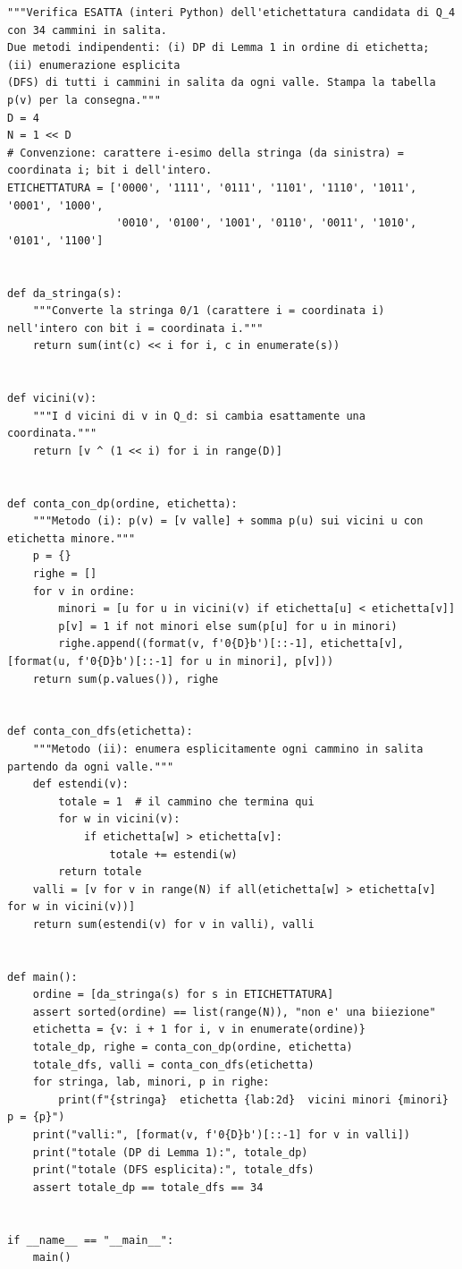 \documentclass[11pt,a4paper]{article}
\begin{document}
\begin{lstlisting}[caption={certificati/verifica\_etichettatura\_q4.py}]
"""Verifica ESATTA (interi Python) dell'etichettatura candidata di Q_4 con 34 cammini in salita.
Due metodi indipendenti: (i) DP di Lemma 1 in ordine di etichetta; (ii) enumerazione esplicita
(DFS) di tutti i cammini in salita da ogni valle. Stampa la tabella p(v) per la consegna."""
D = 4
N = 1 << D
# Convenzione: carattere i-esimo della stringa (da sinistra) = coordinata i; bit i dell'intero.
ETICHETTATURA = ['0000', '1111', '0111', '1101', '1110', '1011', '0001', '1000',
                 '0010', '0100', '1001', '0110', '0011', '1010', '0101', '1100']


def da_stringa(s):
    """Converte la stringa 0/1 (carattere i = coordinata i) nell'intero con bit i = coordinata i."""
    return sum(int(c) << i for i, c in enumerate(s))


def vicini(v):
    """I d vicini di v in Q_d: si cambia esattamente una coordinata."""
    return [v ^ (1 << i) for i in range(D)]


def conta_con_dp(ordine, etichetta):
    """Metodo (i): p(v) = [v valle] + somma p(u) sui vicini u con etichetta minore."""
    p = {}
    righe = []
    for v in ordine:
        minori = [u for u in vicini(v) if etichetta[u] < etichetta[v]]
        p[v] = 1 if not minori else sum(p[u] for u in minori)
        righe.append((format(v, f'0{D}b')[::-1], etichetta[v], [format(u, f'0{D}b')[::-1] for u in minori], p[v]))
    return sum(p.values()), righe


def conta_con_dfs(etichetta):
    """Metodo (ii): enumera esplicitamente ogni cammino in salita partendo da ogni valle."""
    def estendi(v):
        totale = 1  # il cammino che termina qui
        for w in vicini(v):
            if etichetta[w] > etichetta[v]:
                totale += estendi(w)
        return totale
    valli = [v for v in range(N) if all(etichetta[w] > etichetta[v] for w in vicini(v))]
    return sum(estendi(v) for v in valli), valli


def main():
    ordine = [da_stringa(s) for s in ETICHETTATURA]
    assert sorted(ordine) == list(range(N)), "non e' una biiezione"
    etichetta = {v: i + 1 for i, v in enumerate(ordine)}
    totale_dp, righe = conta_con_dp(ordine, etichetta)
    totale_dfs, valli = conta_con_dfs(etichetta)
    for stringa, lab, minori, p in righe:
        print(f"{stringa}  etichetta {lab:2d}  vicini minori {minori}  p = {p}")
    print("valli:", [format(v, f'0{D}b')[::-1] for v in valli])
    print("totale (DP di Lemma 1):", totale_dp)
    print("totale (DFS esplicita):", totale_dfs)
    assert totale_dp == totale_dfs == 34


if __name__ == "__main__":
    main()

\end{lstlisting}
\end{document}
